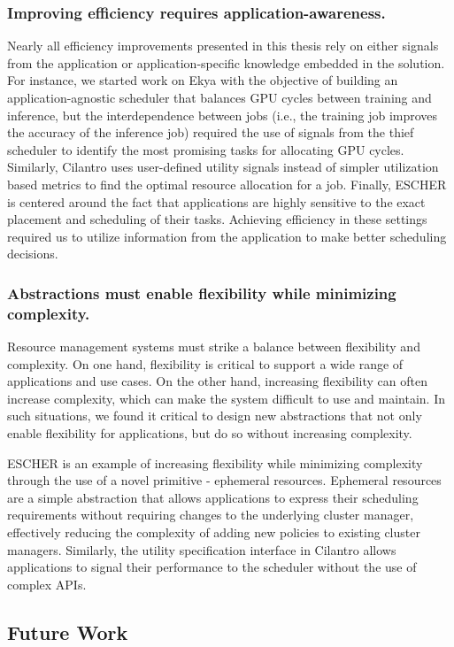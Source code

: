\subsubsection{Improving efficiency requires application-awareness.}
Nearly all efficiency improvements presented in this thesis rely on either signals from the application or application-specific knowledge embedded in the solution. For instance, we started work on Ekya with the objective of building an application-agnostic scheduler that balances GPU cycles between training and inference, but the interdependence between jobs (i.e., the training job improves the accuracy of the inference job) required the use of signals from the thief scheduler to identify the most promising tasks for allocating GPU cycles. Similarly, Cilantro uses user-defined utility signals instead of simpler utilization based metrics to find the optimal resource allocation for a job. Finally, ESCHER is centered around the fact that applications are highly sensitive to the exact placement and scheduling of their tasks. Achieving efficiency in these settings required us to utilize information from the application to make better scheduling decisions.

\subsubsection{Abstractions must enable flexibility while minimizing complexity.}
Resource management systems must strike a balance between flexibility and complexity. On one hand, flexibility is critical to support a wide range of applications and use cases. On the other hand, increasing flexibility can often increase complexity, which can make the system difficult to use and maintain. In such situations, we found it critical to design new abstractions that not only enable flexibility for applications, but do so  without increasing complexity. 

ESCHER is an example of increasing flexibility while minimizing complexity through the use of a novel primitive - ephemeral resources. Ephemeral resources are a simple abstraction that allows applications to express their scheduling requirements without requiring changes to the underlying cluster manager, effectively reducing the complexity of adding new policies to existing cluster managers. Similarly, the utility specification interface in Cilantro allows applications to signal their performance to the scheduler without the use of complex APIs. 

\subsection{Future Work}

